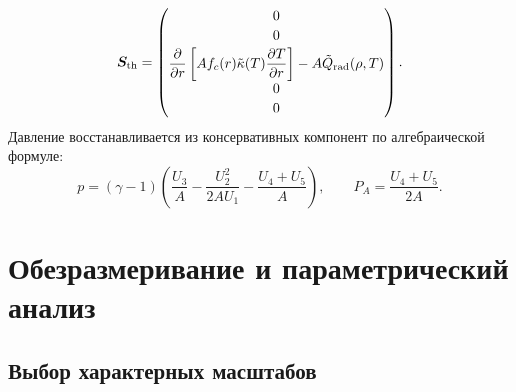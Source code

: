 \documentclass[11pt,a4paper]{article}
\begin{document}
\begin{equation}
\bm{S}_{\rm th} = \begin{pmatrix}
0 \\[2pt]
0 \\[2pt]
\dfrac{\partial}{\partial r}\left[A f_c(r)\tilde{\kappa}(T)\dfrac{\partial T}{\partial r}\right] - A\tilde{Q}_{\rm rad}(\rho, T) \\[6pt]
0 \\[2pt]
0
\end{pmatrix}.
\label{eq:thermal_vector}
\end{equation}
Давление восстанавливается из консервативных компонент по алгебраической формуле:
\begin{equation}
p = (\gamma - 1)\left(\frac{U_3}{A} - \frac{U_2^2}{2 A U_1} - \frac{U_4 + U_5}{A}\right), \qquad P_A = \frac{U_4 + U_5}{2A}.
\label{eq:pressure_recovery}
\end{equation}

\section{Обезразмеривание и параметрический анализ}

\subsection{Выбор характерных масштабов}
\end{document}
